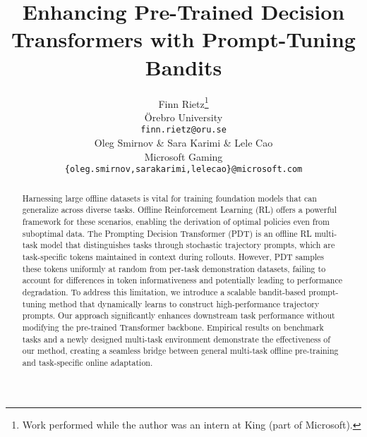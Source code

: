 \documentclass{article} %
\title{Enhancing Pre-Trained Decision Transformers with Prompt-Tuning Bandits}
\author{Finn Rietz\thanks{Work performed while the author was an intern at King (part of Microsoft).} \\
\"Orebro University\\
\texttt{finn.rietz@oru.se} \\
\And
Oleg Smirnov \& Sara Karimi \& Lele Cao\\
Microsoft Gaming\\
\texttt{\{oleg.smirnov,sarakarimi,lelecao\}@microsoft.com}
}
\begin{document}


\printAffiliationsAndNotice{}

\begin{abstract}
Harnessing large offline datasets is vital for training foundation models that can generalize across diverse tasks. 
Offline Reinforcement Learning (RL) offers a powerful framework for these scenarios, enabling the derivation of optimal policies even from suboptimal data. 
The Prompting Decision Transformer (PDT) %
is an offline RL multi-task model that distinguishes tasks through stochastic trajectory prompts, which are task-specific tokens maintained in context during rollouts.
However, PDT samples these tokens uniformly at random from per-task demonstration datasets, failing to account for differences in token informativeness and potentially leading to performance degradation.
To address this limitation, we introduce a scalable bandit-based prompt-tuning method that dynamically learns to construct high-performance trajectory prompts. Our approach significantly enhances downstream task performance without modifying the pre-trained Transformer backbone. 
Empirical results on benchmark tasks and a newly designed multi-task environment demonstrate %
the effectiveness of our method, creating a seamless bridge between general multi-task offline pre-training and task-specific online adaptation.
\end{abstract}
\end{document}
